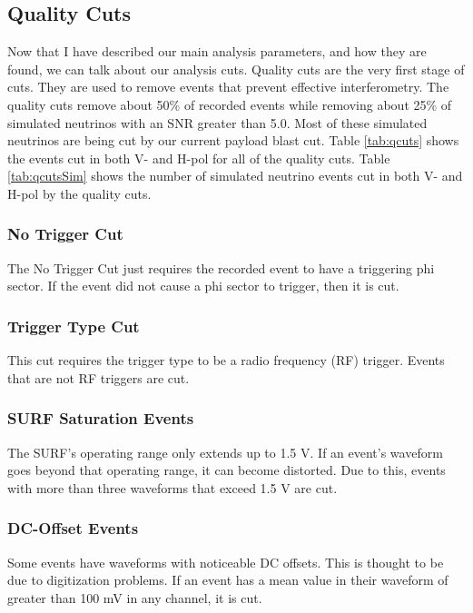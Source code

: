 \subsection{Quality Cuts}

Now that I have described our main analysis parameters, and how they are found, we can talk about our analysis cuts.  Quality cuts are the very first stage of cuts.  They are used to remove events that prevent effective interferometry.   The quality cuts remove about 50\% of recorded events while removing about 25\% of simulated neutrinos with an SNR greater than 5.0.  Most of these simulated neutrinos are being cut by our current payload blast cut.  Table \ref{tab:qcuts} shows the events cut in both V- and H-pol for all of the quality cuts.  Table \ref{tab:qcutsSim} shows the number of simulated neutrino events cut in both V- and H-pol by the quality cuts.

\subsubsection{No Trigger Cut}

The No Trigger Cut just requires the recorded event to have a triggering phi sector.  If the event did not cause a phi sector to trigger, then it is cut.

\subsubsection{Trigger Type Cut}

This cut requires the trigger type to be a radio frequency (RF) trigger.   Events that are not RF triggers are cut.
 
\subsubsection{SURF Saturation Events}

The SURF's operating range only extends up to 1.5 V.  If an event's waveform goes beyond that operating range, it can become distorted\cite{abby}.  Due to this, events with more than three waveforms that exceed 1.5 V are cut.
\subsubsection{DC-Offset Events}

Some events have waveforms with noticeable DC offsets.  This is thought to be due to digitization problems\cite{abby}.  If an event has a mean value in their waveform of greater than 100 mV in any channel, it is cut.  

